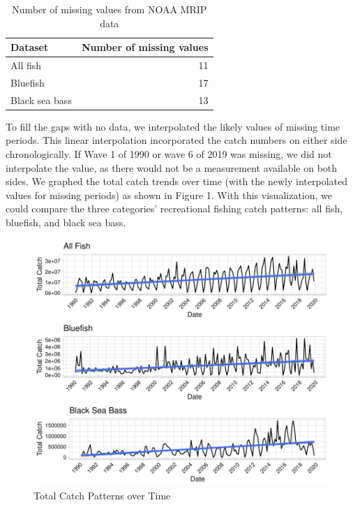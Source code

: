 \documentclass[
  12pt,
]{article}
\begin{document}
\begin{table}[H]

\caption{\label{tab:table3}Number of missing values from NOAA MRIP data}
\centering
\begin{tabular}[t]{l|r}
\hline
Dataset & Number of missing values\\
\hline
All fish & 11\\
\hline
Bluefish & 17\\
\hline
Black sea bass & 13\\
\hline
\end{tabular}
\end{table}

To fill the gaps with no data, we interpolated the likely values of
missing time periods. This linear interpolation incorporated the catch
numbers on either side chronologically. If Wave 1 of 1990 or wave 6 of
2019 was missing, we did not interpolate the value, as there would not
be a measurement available on both sides. We graphed the total catch
trends over time (with the newly interpolated values for missing
periods) as shown in Figure 1. With this visualization, we could compare
the three categories' recreational fishing catch patterns: all fish,
bluefish, and black sea bass.

\begin{figure}[H]

\hfill{}\includegraphics{Report_FishTrends_files/figure-latex/ggplot-1} 

\caption{Total Catch Patterns over Time}\label{fig:ggplot}
\end{figure}
\end{document}
